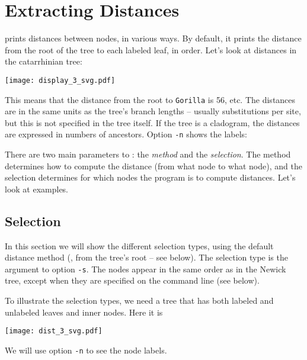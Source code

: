 \section{Extracting Distances}

\distance{} prints distances between nodes, in various ways.  By default, it
prints the distance from the root of the tree to each labeled leaf, in \nw{}
order. Let's look at distances in the catarrhinian tree:

\begin{center}
\texttt{[image: display\_3\_svg.pdf]}
\end{center}


\begin{samepage}

\end{samepage}

\noindent{}This means that the distance from the root to \texttt{Gorilla} is
56, etc. The distances are in the same units as the tree's branch lengths --
usually substitutions per site, but this is not specified in the tree itself.
If the tree is a cladogram, the distances are expressed in numbers of
ancestors.  Option \texttt{-n} shows the labels:


\begin{samepage}

\end{samepage}

There are two main parameters to \distance: the \emph{method} and the
\emph{selection}. The method determines how to compute the distance (from what
node to what node), and the selection determines for which nodes the program is
to compute distances. Let's look at examples.

\subsection{Selection}

In this section we will show the different selection types, using the default
distance method (\ie{}, from the tree's root -- see below). The selection type
is the argument to option \texttt{-s}.  The nodes appear in the same order as
in the Newick tree, except when they are specified on the command line (see
below).

To illustrate the selection types, we need a tree that has both labeled and
unlabeled leaves and inner nodes. Here it is 

\begin{center}
\texttt{[image: dist\_3\_svg.pdf]}
\end{center}
We will use option \texttt{-n} to see the node labels.

